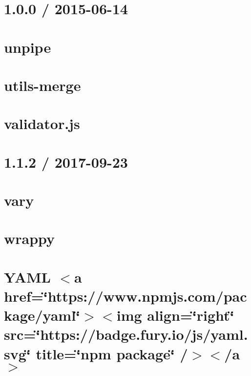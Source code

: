 \documentclass[twoside]{book}
\newcommand{\+}{\discretionary{\mbox{\scriptsize$\hookleftarrow$}}{}{}}
\begin{document}
\chapter{1.0.0 / 2015-\/06-\/14}
\label{md_Backend_nodejs_node_modules_unpipe_HISTORY}

\chapter{unpipe}
\label{md_Backend_nodejs_node_modules_unpipe_README}

\chapter{utils-\/merge}
\label{md_Backend_nodejs_node_modules_utils_merge_README}

\chapter{validator.\+js}
\label{md_Backend_nodejs_node_modules_validator_README}

\chapter{1.1.2 / 2017-\/09-\/23}
\label{md_Backend_nodejs_node_modules_vary_HISTORY}

\chapter{vary}
\label{md_Backend_nodejs_node_modules_vary_README}

\chapter{wrappy}
\label{md_Backend_nodejs_node_modules_wrappy_README}

\chapter{YAML \texorpdfstring{$<$}{<}a href=\char`\"{}https\+://www.\+npmjs.\+com/package/yaml\char`\"{}\texorpdfstring{$>$}{>}\texorpdfstring{$<$}{<}img align=\char`\"{}right\char`\"{} src=\char`\"{}https\+://badge.\+fury.\+io/js/yaml.\+svg\char`\"{} title=\char`\"{}npm package\char`\"{} /\texorpdfstring{$>$}{>}\texorpdfstring{$<$}{<}/a\texorpdfstring{$>$}{>}}
\label{md_Backend_nodejs_node_modules_yaml_README}

\end{document}
